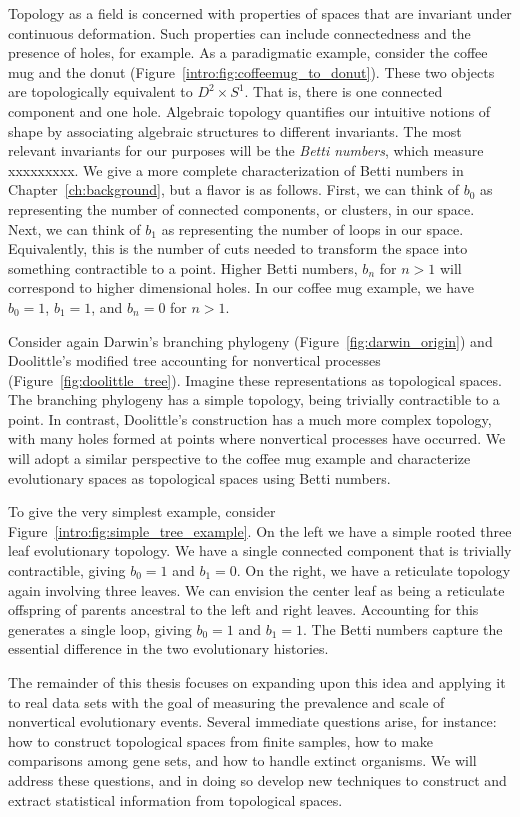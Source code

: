 Topology as a field is concerned with properties of spaces that are invariant under continuous deformation.
Such properties can include connectedness and the presence of holes, for example.
As a paradigmatic example, consider the coffee mug and the donut (Figure~\ref{intro:fig:coffeemug_to_donut}).
These two objects are topologically equivalent to $D^2\times S^1$.
That is, there is one connected component and one hole.
Algebraic topology quantifies our intuitive notions of shape by associating algebraic structures to different invariants.
The most relevant invariants for our purposes will be the \emph{Betti numbers}, which measure xxxxxxxxx.
We give a more complete characterization of Betti numbers in Chapter~\ref{ch:background}, but a flavor is as follows.
First, we can think of $b_0$ as representing the number of connected components, or clusters, in our space.
Next, we can think of $b_1$ as representing the number of loops in our space.
Equivalently, this is the number of cuts needed to transform the space into something contractible to a point.
Higher Betti numbers, $b_n$ for $n>1$ will correspond to higher dimensional holes.
In our coffee mug example, we have $b_0=1$, $b_1=1$, and $b_n=0$ for $n>1$.

Consider again Darwin's branching phylogeny (Figure~\ref{fig:darwin_origin}) and Doolittle's modified tree accounting for nonvertical processes (Figure~\ref{fig:doolittle_tree}).
Imagine these representations as topological spaces.
The branching phylogeny has a simple topology, being trivially contractible to a point.
In contrast, Doolittle's construction has a much more complex topology, with many holes formed at points where nonvertical processes have occurred.
We will adopt a similar perspective to the coffee mug example and characterize evolutionary spaces as topological spaces using Betti numbers.

To give the very simplest example, consider Figure~\ref{intro:fig:simple_tree_example}.
On the left we have a simple rooted three leaf evolutionary topology.
We have a single connected component that is trivially contractible, giving $b_0=1$ and $b_1=0$.
On the right, we have a reticulate topology again involving three leaves.
We can envision the center leaf as being a reticulate offspring of parents ancestral to the left and right leaves.
Accounting for this generates a single loop, giving $b_0=1$ and $b_1=1$.
The Betti numbers capture the essential difference in the two evolutionary histories.

The remainder of this thesis focuses on expanding upon this idea and applying it to real data sets with the goal of measuring the prevalence and scale of nonvertical evolutionary events.
Several immediate questions arise, for instance: how to construct topological spaces from finite samples, how to make comparisons among gene sets, and how to handle extinct organisms.
We will address these questions, and in doing so develop new techniques to construct and extract statistical information from topological spaces.

